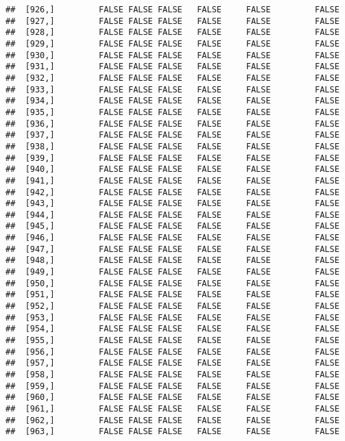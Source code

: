 \documentclass[
]{article}
\begin{document}
\begin{verbatim}
##  [926,]         FALSE FALSE FALSE   FALSE     FALSE         FALSE
##  [927,]         FALSE FALSE FALSE   FALSE     FALSE         FALSE
##  [928,]         FALSE FALSE FALSE   FALSE     FALSE         FALSE
##  [929,]         FALSE FALSE FALSE   FALSE     FALSE         FALSE
##  [930,]         FALSE FALSE FALSE   FALSE     FALSE         FALSE
##  [931,]         FALSE FALSE FALSE   FALSE     FALSE         FALSE
##  [932,]         FALSE FALSE FALSE   FALSE     FALSE         FALSE
##  [933,]         FALSE FALSE FALSE   FALSE     FALSE         FALSE
##  [934,]         FALSE FALSE FALSE   FALSE     FALSE         FALSE
##  [935,]         FALSE FALSE FALSE   FALSE     FALSE         FALSE
##  [936,]         FALSE FALSE FALSE   FALSE     FALSE         FALSE
##  [937,]         FALSE FALSE FALSE   FALSE     FALSE         FALSE
##  [938,]         FALSE FALSE FALSE   FALSE     FALSE         FALSE
##  [939,]         FALSE FALSE FALSE   FALSE     FALSE         FALSE
##  [940,]         FALSE FALSE FALSE   FALSE     FALSE         FALSE
##  [941,]         FALSE FALSE FALSE   FALSE     FALSE         FALSE
##  [942,]         FALSE FALSE FALSE   FALSE     FALSE         FALSE
##  [943,]         FALSE FALSE FALSE   FALSE     FALSE         FALSE
##  [944,]         FALSE FALSE FALSE   FALSE     FALSE         FALSE
##  [945,]         FALSE FALSE FALSE   FALSE     FALSE         FALSE
##  [946,]         FALSE FALSE FALSE   FALSE     FALSE         FALSE
##  [947,]         FALSE FALSE FALSE   FALSE     FALSE         FALSE
##  [948,]         FALSE FALSE FALSE   FALSE     FALSE         FALSE
##  [949,]         FALSE FALSE FALSE   FALSE     FALSE         FALSE
##  [950,]         FALSE FALSE FALSE   FALSE     FALSE         FALSE
##  [951,]         FALSE FALSE FALSE   FALSE     FALSE         FALSE
##  [952,]         FALSE FALSE FALSE   FALSE     FALSE         FALSE
##  [953,]         FALSE FALSE FALSE   FALSE     FALSE         FALSE
##  [954,]         FALSE FALSE FALSE   FALSE     FALSE         FALSE
##  [955,]         FALSE FALSE FALSE   FALSE     FALSE         FALSE
##  [956,]         FALSE FALSE FALSE   FALSE     FALSE         FALSE
##  [957,]         FALSE FALSE FALSE   FALSE     FALSE         FALSE
##  [958,]         FALSE FALSE FALSE   FALSE     FALSE         FALSE
##  [959,]         FALSE FALSE FALSE   FALSE     FALSE         FALSE
##  [960,]         FALSE FALSE FALSE   FALSE     FALSE         FALSE
##  [961,]         FALSE FALSE FALSE   FALSE     FALSE         FALSE
##  [962,]         FALSE FALSE FALSE   FALSE     FALSE         FALSE
##  [963,]         FALSE FALSE FALSE   FALSE     FALSE         FALSE

\end{verbatim}
\end{document}
